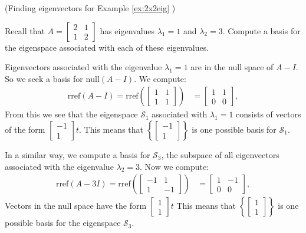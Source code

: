 \documentclass{ximera}
\begin{document}
\begin{example}\label{ex:eigvect2x2eig} (Finding eigenvectors for Example \ref{ex:2x2eig} ) 

Recall that $A=\begin{bmatrix} 2& 1\\ 1&2
\end{bmatrix}$ has eigenvalues $\lambda_1=1$ and $\lambda_2=3$.  Compute a basis for the eigenspace associated with each of these eigenvalues.
\begin{explanation}
Eigenvectors associated with the eigenvalue $\lambda_1=1$ are in the null space of $A-I$.  So we seek a basis for $\mbox{null}(A-I)$.  We compute:
\begin{align*}\mbox{rref}(A-I)=\mbox{rref}\left(\begin{bmatrix}1&1\\1&1\end{bmatrix}\right)&=\begin{bmatrix}1&1\\0&0\end{bmatrix},
\end{align*}
From this we see that the eigenspace $\mathcal{S}_1$ associated with $\lambda_1=1$ consists of vectors of the form $\begin{bmatrix}-1\\1\end{bmatrix}t$.
This means that $\left\{\begin{bmatrix}-1\\1\end{bmatrix}\right\}$ is one possible basis for $\mathcal{S}_1$.

In a similar way, we compute a basis for $\mathcal{S}_3$, the subspace of all eigenvectors associated with the eigenvalue $\lambda_2=3$.  Now we compute:
\begin{align*}\mbox{rref}(A-3I)=\mbox{rref}\left(\begin{bmatrix}-1&1\\1&-1\end{bmatrix}\right)&=\begin{bmatrix}1&-1\\0&0\end{bmatrix},
\end{align*}
Vectors in the null space have the form $\begin{bmatrix}1\\1\end{bmatrix}t$ This means that $\left\{\begin{bmatrix}1\\1\end{bmatrix}\right\}$ is one possible basis for the eigenspace $\mathcal{S}_3$.
\end{explanation}
\end{example}
\end{document}
